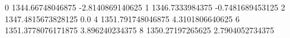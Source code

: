0 1344.66748046875 -2.8140869140625
1 1346.7333984375 -0.7481689453125
2 1347.4815673828125 0.0
4 1351.791748046875 4.3101806640625
6 1351.3778076171875 3.896240234375
8 1350.27197265625 2.7904052734375
